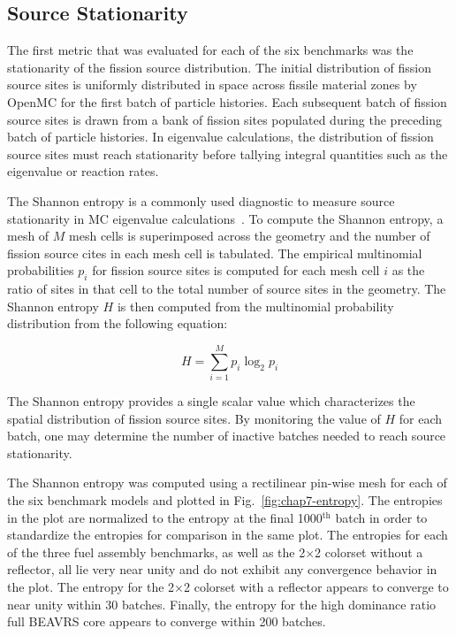 \subsection{Source Stationarity}
\label{subsec:chap7-src-stationarity}

The first metric that was evaluated for each of the six benchmarks was the stationarity of the fission source distribution. The initial distribution of fission source sites is uniformly distributed in space across fissile material zones by OpenMC for the first batch of particle histories. Each subsequent batch of fission source sites is drawn from a bank of fission sites populated during the preceding batch of particle histories. In eigenvalue calculations, the distribution of fission source sites must reach stationarity before tallying integral quantities such as the eigenvalue or reaction rates. 

The Shannon entropy is a commonly used diagnostic to measure source stationarity in \ac{MC} eigenvalue calculations~\cite{brown2006entropy}. To compute the Shannon entropy, a mesh of $M$ mesh cells is superimposed across the geometry and the number of fission source cites in each mesh cell is tabulated. The empirical multinomial probabilities $p_{i}$ for fission source sites is computed for each mesh cell $i$ as the ratio of sites in that cell to the total number of source sites in the geometry. The Shannon entropy $H$ is then computed from the multinomial probability distribution from the following equation:

\begin{equation}
\label{eqn:chap7-shannon-entropy}
H = \displaystyle\sum\limits_{i=1}^{M} p_{i} \log_{2} p_{i}
\end{equation}

\noindent The Shannon entropy provides a single scalar value which characterizes the spatial distribution of fission source sites. By monitoring the value of $H$ for each batch, one may determine the number of inactive batches needed to reach source stationarity.

The Shannon entropy was computed using a rectilinear pin-wise mesh for each of the six benchmark models and plotted in Fig.~\ref{fig:chap7-entropy}. The entropies in the plot are normalized to the entropy at the final 1000$^{\text{th}}$ batch in order to standardize the entropies for comparison in the same plot. The entropies for each of the three fuel assembly benchmarks, as well as the 2$\times$2 colorset without a reflector, all lie very near unity and do not exhibit any convergence behavior in the plot. The entropy for the 2$\times$2 colorset with a reflector appears to converge to near unity within 30 batches. Finally, the entropy for the high dominance ratio full \ac{BEAVRS} core appears to converge within 200 batches. 

